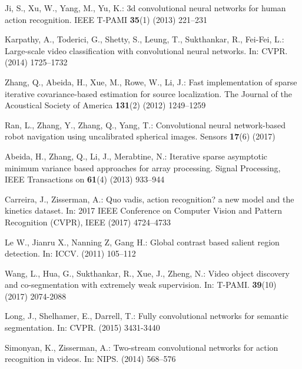 \documentclass[runningheads,a4paper]{llncs}
\begin{document}
\begin{thebibliography}{10}
	Ji, S., Xu, W., Yang, M., Yu, K.:
	\newblock 3d convolutional neural networks for human action recognition.
	\newblock IEEE T-PAMI \textbf{35}(1) (2013)  221--231

	Karpathy, A., Toderici, G., Shetty, S., Leung, T., Sukthankar, R., Fei-Fei, L.:
	\newblock Large-scale video classification with convolutional neural networks.
	\newblock In: CVPR. (2014)  1725--1732

	Zhang, Q., Abeida, H., Xue, M., Rowe, W., Li, J.:
	\newblock Fast implementation of sparse iterative covariance-based estimation
	for source localization.
	\newblock The Journal of the Acoustical Society of America \textbf{131}(2)
	(2012)  1249--1259

	Ran, L., Zhang, Y., Zhang, Q., Yang, T.:
	\newblock Convolutional neural network-based robot navigation using
	uncalibrated spherical images.
	\newblock Sensors \textbf{17}(6) (2017)

	Abeida, H., Zhang, Q., Li, J., Merabtine, N.:
	\newblock Iterative sparse asymptotic minimum variance based approaches for
	array processing.
	\newblock Signal Processing, IEEE Transactions on \textbf{61}(4) (2013)
	933--944

	Carreira, J., Zisserman, A.:
	\newblock Quo vadis, action recognition? a new model and the kinetics dataset.
	\newblock In: 2017 IEEE Conference on Computer Vision and Pattern Recognition
	(CVPR), IEEE (2017)  4724--4733

	Le W., Jianru X., Nanning Z, Gang H.:
	\newblock Global contrast based salient region detection.
	\newblock In: ICCV. (2011)  105--112

	Wang, L., Hua, G., Sukthankar, R., Xue, J., Zheng, N.:
	\newblock Video object discovery and co-segmentation with extremely weak supervision.
	\newblock In: T-PAMI. \textbf{39}(10) (2017)  2074-2088

	Long, J., Shelhamer, E., Darrell, T.:
	\newblock Fully convolutional networks for semantic segmentation.
	\newblock In: CVPR. (2015)  3431-3440

	Simonyan, K., Zisserman, A.:
	\newblock Two-stream convolutional networks for action recognition in videos.
	\newblock In: NIPS. (2014)  568--576


\end{thebibliography}
\end{document}
